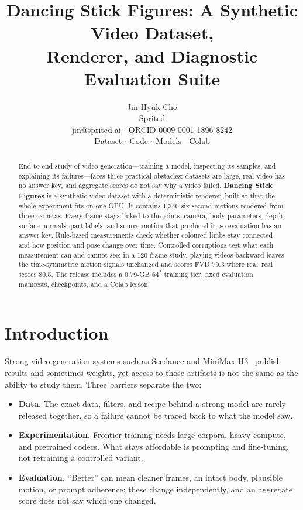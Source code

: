 \documentclass[10pt,twocolumn]{article}
\title{\vspace{-1.5em}\textbf{Dancing Stick Figures: A Synthetic Video Dataset,\\Renderer, and Diagnostic Evaluation Suite}}
\author{Jin Hyuk Cho\\Sprited\\\small\href{mailto:jin@sprited.ai}{jin@sprited.ai} $\cdot$
\href{https://orcid.org/0009-0001-1896-8242}{ORCID 0009-0001-1896-8242}\\[-2pt]
\small\href{https://huggingface.co/datasets/sprited/dancing-stick-figures}{Dataset} $\cdot$
\href{https://github.com/sprited-ai/dancing-stick-figures}{Code} $\cdot$
\href{https://huggingface.co/sprited/dancing-stick-figures-baselines}{Models} $\cdot$
\href{https://colab.research.google.com/github/sprited-ai/dancing-stick-figures/blob/main/notebooks/dancing_stick_figures_colab_v0_3.ipynb}{Colab}}
\date{}
\begin{document}
\raggedbottom\maketitle\vspace{-1.25em}
\begin{abstract}
End-to-end study of video generation---training a model, inspecting its samples, and explaining its
failures---faces three practical obstacles: datasets are large, real video has no answer key,
and aggregate scores do not say why a video failed. \textbf{Dancing Stick Figures} is a synthetic video dataset
with a deterministic renderer, built so that the whole experiment fits on one GPU. It contains 1,340 six-second motions rendered from three cameras. Every frame stays linked to
the joints, camera, body parameters, depth, surface normals, part labels, and source motion that produced it,
so evaluation has an answer key. Rule-based measurements check whether coloured limbs stay connected and how
position and pose change over time. Controlled corruptions test what each measurement can and cannot see: in a
120-frame study, playing videos backward leaves the time-symmetric motion signals unchanged and scores FVD 79.3
where real--real scores 80.5. The release includes a 0.79-GB $64^2$ training tier, fixed evaluation manifests,
checkpoints, and a Colab lesson.
\end{abstract}

\section{Introduction}
Strong video generation systems such as Seedance and MiniMax H3~\cite{gao2025seedance,minimax2026h3} publish
results and sometimes weights, yet access to those artifacts is not the same as the ability to study them.
Three barriers separate the two:
\begin{itemize}[leftmargin=*,nosep]
\item \textbf{Data.} The exact data, filters, and recipe behind a strong model are rarely released together,
so a failure cannot be traced back to what the model saw.
\item \textbf{Experimentation.} Frontier training needs large corpora, heavy compute, and pretrained codecs.
What stays affordable is prompting and fine-tuning, not retraining a controlled variant.
\item \textbf{Evaluation.} ``Better'' can mean cleaner frames, an intact body, plausible motion, or prompt
adherence; these change independently, and an aggregate score does not say which one changed.
\end{itemize}
\end{document}
